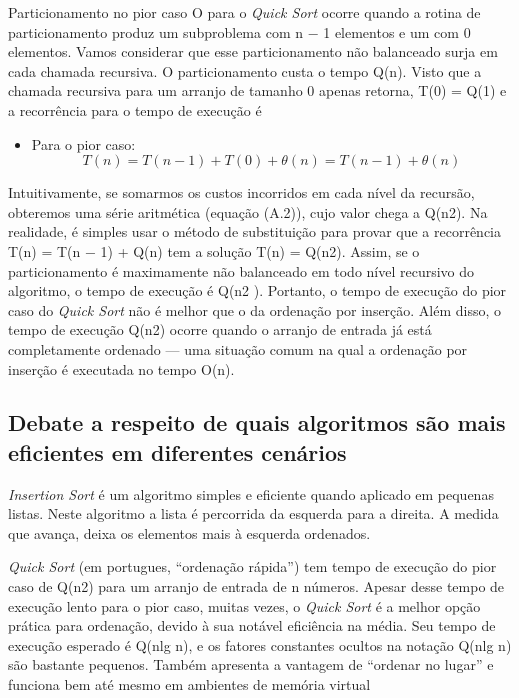 \documentclass{article}
\renewcommand\texttt[1]{{\ttfamily\color{GruvOrange}#1}}
\begin{document}
Particionamento no pior caso \texttt{O} para o \textit{Quick Sort} ocorre quando a rotina de particionamento produz um subproblema com \texttt{n − 1} elementos e um com \texttt{0} elementos. Vamos considerar que esse particionamento não balanceado surja em cada chamada recursiva. O particionamento custa o tempo \texttt{Q(n)}. Visto que a chamada recursiva para um arranjo de tamanho \texttt{0} apenas retorna, \texttt{T(0) = Q(1)} e a recorrência para o tempo de execução é
\begin{itemize}
  \item{Para o pior caso:}
    \begin{equation}
      T(n) = T(n-1) + T(0) + \theta (n) = T(n-1) + \theta (n)
    \end{equation}
\end{itemize}
Intuitivamente, se somarmos os custos incorridos em cada nível da recursão, obteremos uma série aritmética (equação \texttt{(A.2)}), cujo valor chega a \texttt{Q(n2)}. Na realidade, é simples usar o método de substituição para provar que a recorrência \texttt{T(n) = T(n − 1) + Q(n)} tem a solução \texttt{T(n) = Q(n2)}.  Assim, se o particionamento é maximamente não balanceado em todo nível recursivo do algoritmo, o tempo de execução é \texttt{Q(n2 )}. Portanto, o tempo de execução do pior caso do \textit{Quick Sort} não é melhor que o da ordenação por inserção. Além disso, o tempo de execução \texttt{Q(n2)} ocorre quando o arranjo de entrada já está completamente ordenado — uma situação comum na qual a ordenação por inserção é executada no tempo \texttt{O(n)}.

\subsection{Debate a respeito de quais algoritmos são mais eficientes em diferentes cenários}
\textit{Insertion Sort} é um algoritmo simples e eficiente quando aplicado em pequenas listas. Neste algoritmo a lista é percorrida da esquerda para a direita. A medida que avança, deixa os elementos mais à esquerda ordenados.

\textit{Quick Sort} (em portugues, ``ordenação rápida'') tem tempo de execução do pior caso de \texttt{Q(n2)} para um arranjo de entrada de \texttt{n} números. Apesar desse tempo de execução lento para o pior caso, muitas vezes, o \textit{Quick Sort} é a melhor opção prática para ordenação, devido à sua notável eficiência na média. Seu tempo de execução esperado é \texttt{Q(nlg n)}, e os fatores constantes ocultos na notação \texttt{Q(nlg n)} são bastante pequenos. Também apresenta a vantagem de ``ordenar no lugar'' e funciona bem até mesmo em ambientes de memória virtual
\end{document}
